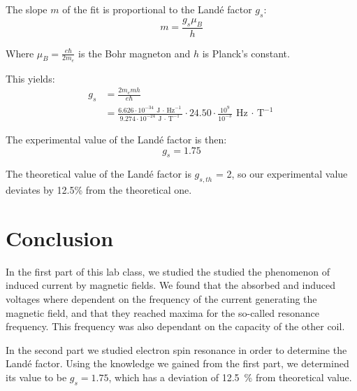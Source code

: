\documentclass{scrartcl}
\begin{document}
The slope $m$ of the fit is proportional to the Landé factor $g_s$:
\begin{equation*}
    m = \frac{g_s \mu_B}{h}
\end{equation*}

Where $\mu_B = \frac{e \hbar}{2m_e}$ is the Bohr magneton and $h$ is Planck's constant.

This yields:
\begin{align*}
    g_s &= \frac{2m_emh}{e \hbar} \\
    &= \frac{6.626 \cdot 10^{-34} \ \text{J $\cdot$ Hz}^{-1}}{9.274 \cdot 10^{-24} \ \text{J $\cdot$ T}^{-1}} \cdot 24.50 \cdot \frac{10^9}{10^{-3}}\ \text{Hz $\cdot$ T}^{-1} 
\end{align*}

The experimental value of the Landé factor is then:
\begin{equation*}
    \boxed{g_s = 1.75}
\end{equation*}

The theoretical value of the Landé factor is $g_{s,th}$ = 2, so our experimental value deviates by 12.5\% from the theoretical one. 

\section{Conclusion}
In the first part of this lab class, we studied the studied the phenomenon of induced current by magnetic fields. We found that the absorbed and induced voltages where dependent on the frequency of the current generating the magnetic field, and that they reached maxima for the so-called resonance frequency. This frequency was also dependant on the capacity of the other coil.

In the second part we studied electron spin resonance in order to determine the Landé factor. Using the knowledge we gained from the first part, we determined its value to be $g_s = 1.75$, which has a deviation of 12.5~\% from theoretical value.
\end{document}
